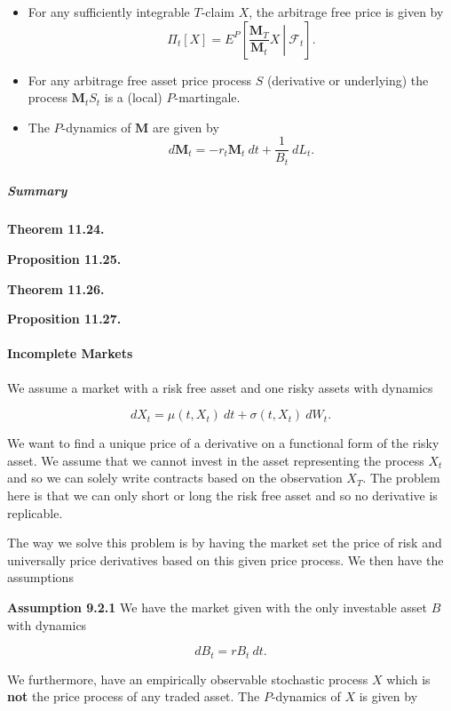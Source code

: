 \documentclass[
]{article}
\providecommand{\tightlist}{%
  \setlength{\itemsep}{0pt}\setlength{\parskip}{0pt}}
\begin{document}
\begin{itemize}
\tightlist
\item
  For any sufficiently integrable \(T\)-claim \(X\), the arbitrage free
  price is given by \[
    \Pi_t[X]=E^P\left[\left. \frac{\mathbf{M}_T}{\mathbf{M}_t} X \ \right\vert\ \mathcal{F}_t\right].
    \]
\item
  For any arbitrage free asset price process \(S\) (derivative or
  underlying) the process \(\mathbf{M}_tS_t\) is a (local)
  \(P\)-martingale.
\item
  The \(P\)-dynamics of \(\mathbf{M}\) are given by \[
    d\mathbf{M}_t=-r_t\mathbf{M}_t\ dt+\frac{1}{B_t}\ dL_t.
    \]
\end{itemize}

\hypertarget{summary}{%
\subparagraph{Summary}\label{summary}}

\textbf{Theorem 11.24.}

\textbf{Proposition 11.25.}

\textbf{Theorem 11.26.}

\textbf{Proposition 11.27.}

\hypertarget{incomplete-markets}{%
\paragraph{Incomplete Markets}\label{incomplete-markets}}

We assume a market with a risk free asset and one risky assets with
dynamics

\[
dX_t=\mu(t,X_t)\ dt+\sigma(t,X_t)\ dW_t.
\]

We want to find a unique price of a derivative on a functional form of
the risky asset. We assume that we cannot invest in the asset
representing the process \(X_t\) and so we can solely write contracts
based on the observation \(X_T\). The problem here is that we can only
short or long the risk free asset and so no derivative is replicable.

The way we solve this problem is by having the market set the price of
risk and universally price derivatives based on this given price
process. We then have the assumptions

\textbf{Assumption 9.2.1} We have the market given with the only
investable asset \(B\) with dynamics

\[
dB_t=rB_t\ dt.
\]

We furthermore, have an empirically observable stochastic process \(X\)
which is \textbf{not} the price process of any traded asset. The
\(P\)-dynamics of \(X\) is given by
\end{document}
